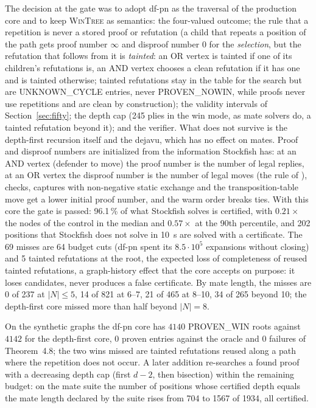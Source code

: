 \documentclass{article}
\theoremstyle{plain}
\theoremstyle{definition}
\theoremstyle{remark}
\newcommand{\PW}{\textsf{PROVEN\_WIN}}
\newcommand{\PN}{\textsf{PROVEN\_NOWIN}}
\newcommand{\UC}{\textsf{UNKNOWN\_CYCLE}}
\newcommand{\WT}{\textsc{WinTree}}
\begin{document}
The decision at the gate was to adopt df-pn as the traversal of the production core and to keep \WT{} as semantics: the four-valued outcome; the rule that a repetition is never a stored proof or refutation (a child that repeats a position of the path gets proof number $\infty$ and disproof number $0$ for the \emph{selection}, but the refutation that follows from it is \emph{tainted}: an OR vertex is tainted if one of its children's refutations is, an AND vertex chooses a clean refutation if it has one and is tainted otherwise; tainted refutations stay in the table for the search but are \UC{} entries, never \PN{}, while proofs never use repetitions and are clean by construction); the validity intervals of Section~\ref{sec:fifty}; the depth cap (245 plies in the win mode, as mate solvers do, a tainted refutation beyond it); and the verifier. What does not survive is the depth-first recursion itself and the dejavu, which has no effect on mates. Proof and disproof numbers are initialized from the information Stockfish has: at an AND vertex (defender to move) the proof number is the number of legal replies, at an OR vertex the disproof number is the number of legal moves (the rule of \cite{allis1994pn}), checks, captures with non-negative static exchange and the transposition-table move get a lower initial proof number, and the warm order breaks ties. With this core the gate is passed: 96.1\,\% of what Stockfish solves is certified, with $0.21\times$ the nodes of the control in the median and $0.57\times$ at the 90th percentile, and 202 positions that Stockfish does not solve in 10~s are solved with a certificate. The 69 misses are 64 budget cuts (df-pn spent its $8.5 \cdot 10^5$ expansions without closing) and 5 tainted refutations at the root, the expected loss of completeness of reused tainted refutations, a graph-history effect \cite{campbell1985,breuker2001,kishimoto2004} that the core accepts on purpose: it loses candidates, never produces a false certificate. By mate length, the misses are 0 of 237 at $|N| \leq 5$, 14 of 821 at 6--7, 21 of 465 at 8--10, 34 of 265 beyond 10; the depth-first core missed more than half beyond $|N| = 8$.

On the synthetic graphs the df-pn core has $4140$ \PW{} roots against $4142$ for the depth-first core, $0$ proven entries against the oracle and $0$ failures of Theorem~4.8; the two wins missed are tainted refutations reused along a path where the repetition does not occur. A later addition re-searches a found proof with a decreasing depth cap (first $d - 2$, then bisection) within the remaining budget: on the mate suite the number of positions whose certified depth equals the mate length declared by the suite rises from 704 to 1567 of 1934, all certified.
\end{document}
